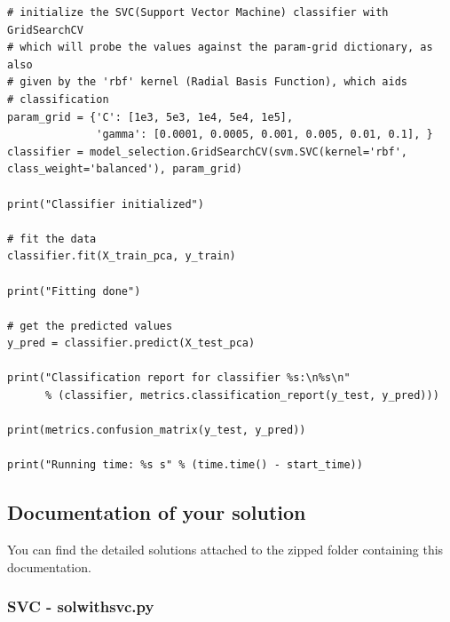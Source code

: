 \documentclass[a4paper,10pt]{article}
\newcommand\tab[1][0.5cm]{\hspace*{#1}}
\begin{document}
\begin{lstlisting}
# initialize the SVC(Support Vector Machine) classifier with GridSearchCV
# which will probe the values against the param-grid dictionary, as also 
# given by the 'rbf' kernel (Radial Basis Function), which aids
# classification
param_grid = {'C': [1e3, 5e3, 1e4, 5e4, 1e5],
              'gamma': [0.0001, 0.0005, 0.001, 0.005, 0.01, 0.1], }
classifier = model_selection.GridSearchCV(svm.SVC(kernel='rbf',
class_weight='balanced'), param_grid)

print("Classifier initialized")

# fit the data
classifier.fit(X_train_pca, y_train)

print("Fitting done")

# get the predicted values
y_pred = classifier.predict(X_test_pca)

print("Classification report for classifier %s:\n%s\n"
      % (classifier, metrics.classification_report(y_test, y_pred)))

print(metrics.confusion_matrix(y_test, y_pred))

print("Running time: %s s" % (time.time() - start_time))
  \end{lstlisting}

  \subsection{Documentation of your solution}
  
  \tab You can find the detailed solutions attached to the zipped folder containing this documentation.
  
  \subsubsection{SVC - solwithsvc.py}
  
\end{document}
